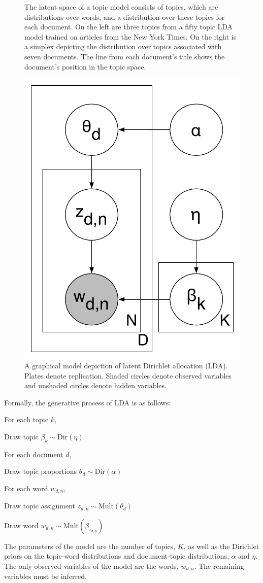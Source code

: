 \begin{figure}[t]
{  \label{fig:nyttopics:doc}
}
\caption{The latent space of a topic model consists of topics,
  which are distributions over words, and a distribution over these
  topics for each document.  On the left are three topics from a
  fifty topic LDA model trained on articles from the New York
  Times.  On the right is a simplex depicting the distribution
  over topics associated with seven documents.  The line from each
  document's title shows the document's position in the topic
  space.}
\label{fig:nyttopics:big}
\end{figure}

\begin{figure}[t]
\centering
\includegraphics[width=0.5\linewidth]{figures/lda}
\caption{A graphical model depiction of latent Dirichlet allocation
  (LDA).  Plates denote replication.  Shaded circles denote observed
  variables and unshaded circles denote hidden variables.}
\label{fig:lda}
\end{figure}

Formally, the generative process of LDA is as follows:
\begin{enumerate*}
  \item For each topic $k$, 
    \begin{enumerate*}
    \item Draw topic $\beta_k \sim \mathrm{Dir}(\eta)$
    \end{enumerate*}
  \item For each document $d$, 
    \begin{enumerate*}
    \item Draw topic proportions $\theta_d \sim \mathrm{Dir}(\alpha)$
    \item For each word $w_{d, n}$, 
      \begin{enumerate*}
      \item Draw topic assignment $z_{d,n} \sim \mathrm{Mult}(\theta_d)$
      \item Draw word $w_{d,n} \sim \mathrm{Mult}(\beta_{z_{d,n}})$
      \end{enumerate*}
    \end{enumerate*}
\end{enumerate*}
The parameters of the model are the number of topics, $K$, as well as
the Dirichlet priors on the topic-word distributions and
document-topic distributions, $\alpha$ and $\eta$.  The only observed
variables of the model are the words, $w_{d,n}$.  The remaining
variables must be inferred.

